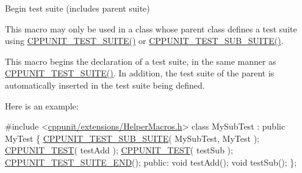Begin test suite (includes parent suite) 

This macro may only be used in a class whose parent class defines a test suite using \hyperlink{group___writing_test_fixture_gabe1e12200f40d6f25d60c1783c99da81}{C\-P\-P\-U\-N\-I\-T\-\_\-\-T\-E\-S\-T\-\_\-\-S\-U\-I\-T\-E()} or \hyperlink{group___writing_test_fixture_gae19f30ade82172cf6c3ff297367a10c2}{C\-P\-P\-U\-N\-I\-T\-\_\-\-T\-E\-S\-T\-\_\-\-S\-U\-B\-\_\-\-S\-U\-I\-T\-E()}.

This macro begins the declaration of a test suite, in the same manner as \hyperlink{group___writing_test_fixture_gabe1e12200f40d6f25d60c1783c99da81}{C\-P\-P\-U\-N\-I\-T\-\_\-\-T\-E\-S\-T\-\_\-\-S\-U\-I\-T\-E()}. In addition, the test suite of the parent is automatically inserted in the test suite being defined.

Here is an example\-:


\begin{DoxyCode}
\textcolor{preprocessor}{#include <\hyperlink{_helper_macros_8h}{cppunit/extensions/HelperMacros.h}>}
\textcolor{keyword}{class }MySubTest : \textcolor{keyword}{public} MyTest \{
  \hyperlink{group___writing_test_fixture_gae19f30ade82172cf6c3ff297367a10c2}{CPPUNIT\_TEST\_SUB\_SUITE}( MySubTest, MyTest );
  \hyperlink{group___writing_test_fixture_gaac9b03d898b207e1daf2f93867935a96}{CPPUNIT\_TEST}( testAdd );
  \hyperlink{group___writing_test_fixture_gaac9b03d898b207e1daf2f93867935a96}{CPPUNIT\_TEST}( testSub );
  \hyperlink{group___writing_test_fixture_ga601b2e1d525f3947b216e28c625abcb1}{CPPUNIT\_TEST\_SUITE\_END}();
\textcolor{keyword}{public}:
  \textcolor{keywordtype}{void} testAdd();
  \textcolor{keywordtype}{void} testSub();
\};
\end{DoxyCode}



